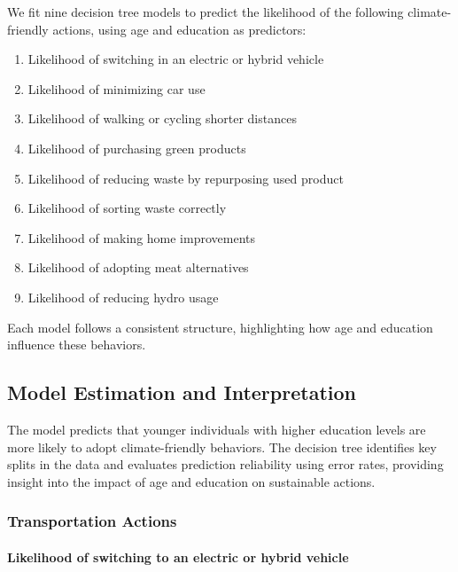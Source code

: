 \documentclass[
  letterpaper,
  DIV=11,
  numbers=noendperiod]{scrartcl}
\let\oldparagraph\paragraph
\renewcommand{\paragraph}[1]{\oldparagraph{#1}\mbox{}}
\providecommand{\tightlist}{%
  \setlength{\itemsep}{0pt}\setlength{\parskip}{0pt}}\usepackage{longtable,booktabs,array}
\begin{document}
We fit nine decision tree models to predict the likelihood of the
following climate-friendly actions, using age and education as
predictors:

\begin{enumerate}
\def\labelenumi{\arabic{enumi}.}
\tightlist
\item
  Likelihood of switching in an electric or hybrid vehicle
\item
  Likelihood of minimizing car use
\item
  Likelihood of walking or cycling shorter distances
\item
  Likelihood of purchasing green products
\item
  Likelihood of reducing waste by repurposing used product
\item
  Likelihood of sorting waste correctly
\item
  Likelihood of making home improvements
\item
  Likelihood of adopting meat alternatives
\item
  Likelihood of reducing hydro usage
\end{enumerate}

Each model follows a consistent structure, highlighting how age and
education influence these behaviors.

\subsection{Model Estimation and
Interpretation}\label{model-estimation-and-interpretation}

The model predicts that younger individuals with higher education levels
are more likely to adopt climate-friendly behaviors. The decision tree
identifies key splits in the data and evaluates prediction reliability
using error rates, providing insight into the impact of age and
education on sustainable actions.

\subsubsection{Transportation Actions}\label{transportation-actions}

\paragraph{Likelihood of switching to an electric or hybrid
vehicle}\label{likelihood-of-switching-to-an-electric-or-hybrid-vehicle}
\end{document}
